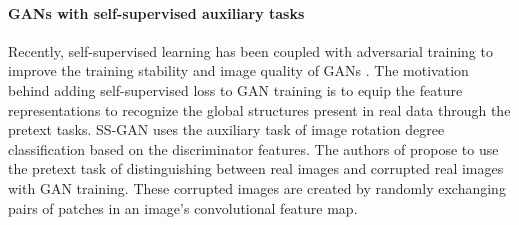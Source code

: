 \documentclass[10pt,twocolumn,letterpaper]{article}
\begin{document}
\paragraph{GANs with self-supervised auxiliary tasks}
Recently, self-supervised learning has been coupled with adversarial training to improve the training stability and image quality of GANs \cite{fxgan2020wacv,rot_ssgan2019chen, tran_2019_neurips_gan}. The motivation behind adding self-supervised loss to GAN training is to equip the feature representations to recognize the global structures present in real data through the pretext tasks. SS-GAN \cite{rot_ssgan2019chen} uses the auxiliary task of image rotation degree classification based on the discriminator features. The authors of \cite{fxgan2020wacv} propose to use the pretext task of distinguishing between real images and corrupted real images with GAN training. These corrupted images are created by randomly exchanging pairs of patches in an image’s convolutional feature map. 
\end{document}
